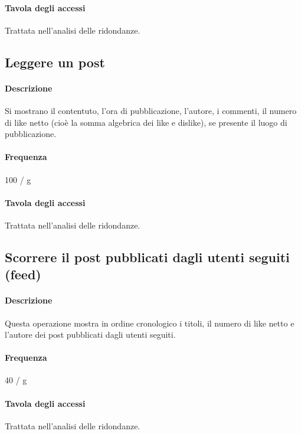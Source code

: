 \documentclass[a4paper,12pt]{report}
\begin{document}
\paragraph{Tavola degli accessi}  
Trattata nell'analisi delle ridondanze.
\subsection{Leggere un post} \label{leggere_post}
\paragraph{Descrizione} Si mostrano il contentuto, l'ora di pubblicazione, l'autore, i commenti, il numero di like netto (cioè la somma algebrica dei like e dislike), se presente il luogo di pubblicazione.
\paragraph{Frequenza} 100 / g
\paragraph{Tavola degli accessi}  
Trattata nell'analisi delle ridondanze.
\subsection{Scorrere il post pubblicati dagli utenti seguiti (feed)} \label{feed}
\paragraph{Descrizione} Questa operazione mostra in ordine cronologico i titoli, il numero di like netto e l'autore dei post pubblicati dagli utenti seguiti.
\paragraph{Frequenza} 40 / g
\paragraph{Tavola degli accessi}  
Trattata nell'analisi delle ridondanze.
\end{document}
